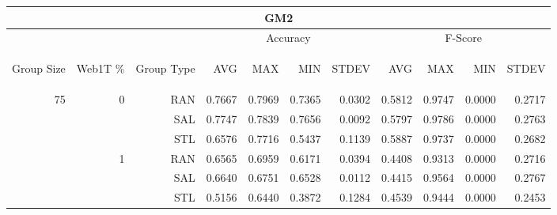 \begin{center}
\begin{table}[htbp] 
 \begin{center}
\begin{tabular}{ | r | r | r | r | r | r | r | r | r | r | r |}
\hline
\multicolumn{11}{|c|}{GM2}\\
\hline
 & & & \multicolumn{4}{|c|}{Accuracy} & \multicolumn{4}{|c|}{F-Score}\\ \cline{4-11}
\begin{sideways}Group Size\end{sideways} & \begin{sideways}Web1T \%\end{sideways} & \begin{sideways}Group Type\end{sideways} & \begin{sideways}AVG\end{sideways} & \begin{sideways}MAX\end{sideways} & \begin{sideways}MIN\end{sideways} & \begin{sideways}STDEV\end{sideways} & \begin{sideways}AVG\end{sideways} & \begin{sideways}MAX\end{sideways} & \begin{sideways}MIN\end{sideways} & \begin{sideways}STDEV\end{sideways}\\
\hline
\multirow{15}{*}{75}
 & \multirow{3}{*}{0} & RAN & 0.7667 & 0.7969 & 0.7365 & 0.0302 & 0.5812 & 0.9747 & 0.0000 & 0.2717\\ \cline{3-11}
 &   & SAL & 0.7747 & 0.7839 & 0.7656 & 0.0092 & 0.5797 & 0.9786 & 0.0000 & 0.2763\\ \cline{3-11}
 &   & STL & 0.6576 & 0.7716 & 0.5437 & 0.1139 & 0.5887 & 0.9737 & 0.0000 & 0.2682\\ \cline{2-11}
 & \multirow{3}{*}{1} & RAN & 0.6565 & 0.6959 & 0.6171 & 0.0394 & 0.4408 & 0.9313 & 0.0000 & 0.2716\\ \cline{3-11}
 &   & SAL & 0.6640 & 0.6751 & 0.6528 & 0.0112 & 0.4415 & 0.9564 & 0.0000 & 0.2767\\ \cline{3-11}
 &   & STL & 0.5156 & 0.6440 & 0.3872 & 0.1284 & 0.4539 & 0.9444 & 0.0000 & 0.2453\\ \cline{2-11}

\end{tabular}
\end{center}
\end{table}
\end{center}
